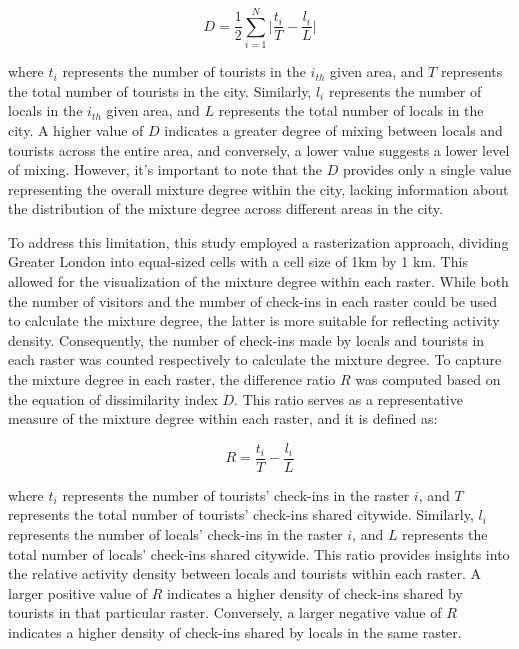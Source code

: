 \documentclass{article}
\begin{document}
\begin{equation} \label{eq:dissimilarity_index}
    D = \frac{1}{2}\sum_{i=1}^{N}\bigg|\frac{t_{i}}{T}-\frac{l_{i}}{L}\bigg|
\end{equation}

where $t_{i}$ represents the number of tourists in the $i_{th}$ given area, and $T$ represents the total number of tourists in the city. Similarly, $l_{i}$ represents the number of locals in the $i_{th}$ given area, and $L$ represents the total number of locals in the city. A higher value of $D$ indicates a greater degree of mixing between locals and tourists across the entire area, and conversely, a lower value suggests a lower level of mixing. However, it's important to note that the $D$ provides only a single value representing the overall mixture degree within the city, lacking information about the distribution of the mixture degree across different areas in the city.

To address this limitation, this study employed a rasterization approach, dividing Greater London into equal-sized cells with a cell size of 1km by 1 km. This allowed for the visualization of the mixture degree within each raster. While both the number of visitors and the number of check-ins in each raster could be used to calculate the mixture degree, the latter is more suitable for reflecting activity density. Consequently, the number of check-ins made by locals and tourists in each raster was counted respectively to calculate the mixture degree. To capture the mixture degree in each raster, the difference ratio $R$ was computed based on the equation of dissimilarity index $D$. This ratio serves as a representative measure of the mixture degree within each raster, and it is defined as:

\begin{equation} \label{eq:diff_ratio}
    R = \frac{t_{i}}{T}-\frac{l_{i}}{L}
\end{equation}

where $t_{i}$ represents the number of tourists' check-ins in the raster $i$, and $T$ represents the total number of tourists' check-ins shared citywide. Similarly, $l_{i}$ represents the number of locals' check-ins in the raster $i$, and $L$ represents the total number of locals' check-ins shared citywide. This ratio provides insights into the relative activity density between locals and tourists within each raster. A larger positive value of $R$ indicates a higher density of check-ins shared by tourists in that particular raster. Conversely, a larger negative value of \(R\) indicates a higher density of check-ins shared by locals in the same raster.
\end{document}
